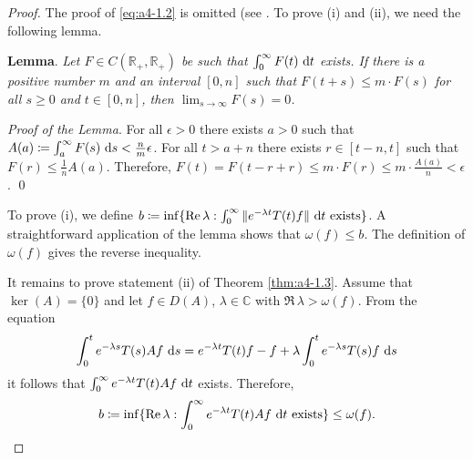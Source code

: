 \begin{proof}  The proof of \eqref{eq:a4-1.2} is omitted (see \citet[p.306]{hillephillips:1957}. 
To prove (i) and (ii), we need the following lemma.



{\bf Lemma}. 
\label{lem:a4-1.3}
{\it Let $F \in C(\mathbb{R}_{+},\mathbb{R}_{+})$ be such that $\int_{0}^{\infty} F(t) \,\mathop{}\!\mathrm{d}{t}$ exists. 
If there is a positive number $m$ and an interval $[0,n]$ such that $F(t + s) \leq m \cdot F(s)$ for all $s \geq 0$ and $t \in [0,n]$, then $\lim_{s \to \infty} F(s) = 0$.}



\textit{Proof of the Lemma}. 
For all $\epsilon > 0$ there exists $a > 0$ such that $A(a) \coloneqq \int_{a}^{\infty} F(s) \,\mathop{}\!\mathrm{d}{s} < \frac{n}{m}\epsilon$.
For all $t > a+n$ there exists $r \in [t-n,t]$ such that $F(r) \leq \frac{1}{n}A(a)$.
Therefore, $F(t) = F(t-r+r) \leq m \cdot F(r) \leq m \cdot \frac{A(a)}{n} < \epsilon$. 
\qed



To prove (i), we define $b \coloneqq \inf\{\mathop{}\!\mathrm{Re}\,\lambda : \int_{0}^{\infty} \|e^{-\lambda t} T(t)f\| \,\mathop{}\!\mathrm{d}{t} \text{ exists}\}$. 
A straightforward application of the lemma shows that $\omega(f) \leq b$.
The definition of $\omega(f)$ gives the reverse inequality.

\goodbreak


It remains to prove statement (ii) of Theorem \ref{thm:a4-1.3}.
Assume that $\ker(A) = \{0\}$ and let $f \in D(A)$, $\lambda \in \mathbb{C}$ with $\Re\,\lambda > \omega(f)$. 
From the equation
\[
\int_{0}^{t} e^{-\lambda s} T(s)Af \,\mathop{}\!\mathrm{d}{s} = e^{-\lambda t}T(t)f - f + \lambda \int_{0}^{t} e^{-\lambda s} T(s)f \,\mathop{}\!\mathrm{d}{s}
\]
it follows that $\int_{0}^{\infty} e^{-\lambda t} T(t)Af \,\mathop{}\!\mathrm{d}{t}$ exists. 
Therefore, 
\[b \coloneqq \inf\{\mathop{}\!\mathrm{Re}\,\lambda : \int_{0}^{\infty} e^{-\lambda t}T(t)Af \,\mathop{}\!\mathrm{d}{t} \text{ exists}\} \leq \omega(f).\]




\end{proof}
